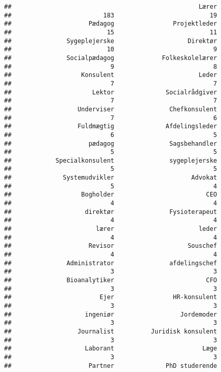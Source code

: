 \documentclass[]{article}
\begin{document}
\begin{verbatim}
##                                                   Lærer 
##                         183                          19 
##                     Pædagog                Projektleder 
##                          15                          11 
##               Sygeplejerske                    Direktør 
##                          10                           9 
##               Socialpædagog             Folkeskolelærer 
##                           9                           8 
##                   Konsulent                       Leder 
##                           7                           7 
##                      Lektor              Socialrådgiver 
##                           7                           7 
##                  Underviser               Chefkonsulent 
##                           7                           6 
##                  Fuldmægtig              Afdelingsleder 
##                           6                           5 
##                     pædagog               Sagsbehandler 
##                           5                           5 
##            Specialkonsulent               sygeplejerske 
##                           5                           5 
##              Systemudvikler                     Advokat 
##                           5                           4 
##                   Bogholder                         CEO 
##                           4                           4 
##                    direktør               Fysioterapeut 
##                           4                           4 
##                       lærer                       leder 
##                           4                           4 
##                     Revisor                    Souschef 
##                           4                           4 
##               Administrator               afdelingschef 
##                           3                           3 
##               Bioanalytiker                         CFO 
##                           3                           3 
##                        Ejer                HR-konsulent 
##                           3                           3 
##                    ingeniør                  Jordemoder 
##                           3                           3 
##                  Journalist          Juridisk konsulent 
##                           3                           3 
##                    Laborant                        Læge 
##                           3                           3 
##                     Partner              PhD studerende 

\end{verbatim}
\end{document}
